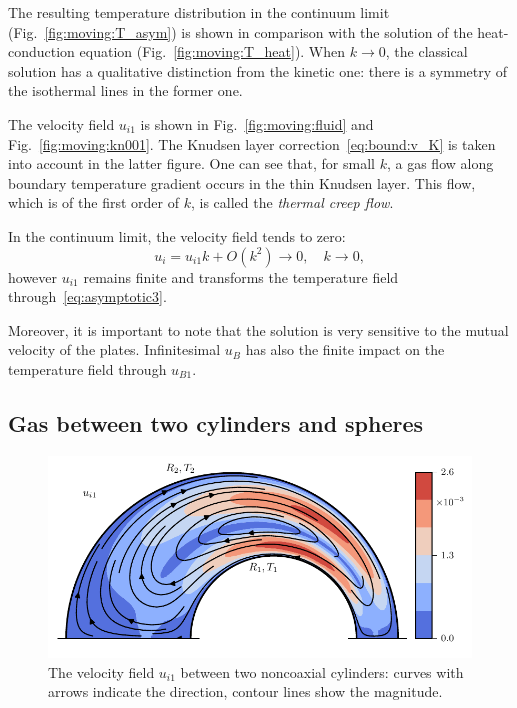 \documentclass[smallextended, referee]{svjour3} %
\begin{document}
The resulting temperature distribution in the continuum limit (Fig.~\ref{fig:moving:T_asym}) is shown
in comparison with the solution of the heat-conduction equation (Fig.~\ref{fig:moving:T_heat}).
When \(k\to0\), the classical solution has a qualitative distinction from the kinetic one: 
there is a symmetry of the isothermal lines in the former one.

The velocity field \(u_{i1}\) is shown in Fig.~\ref{fig:moving:fluid} and Fig.~\ref{fig:moving:kn001}.
The Knudsen layer correction~\eqref{eq:bound:v_K} is taken into account in the latter figure.
One can see that, for small \(k\), a gas flow along boundary temperature gradient occurs
in the thin Knudsen layer. This flow, which is of the first order of \(k\), is called
the \emph{thermal creep flow}.

In the continuum limit, the velocity field tends to zero:
\[ u_i = u_{i1}k + O(k^2) \to 0, \quad k\to0, \]
however \(u_{i1}\) remains finite and transforms the temperature field through~\eqref{eq:asymptotic3}.

Moreover, it is important to note that the solution is very sensitive to the mutual velocity of the plates.
Infinitesimal \(u_B\) has also the finite impact on the temperature field through \(u_{B1}\).

\subsection{Gas between two cylinders and spheres}

\begin{figure}
	\centering
	\includegraphics{Fig7}
	\caption{The velocity field \(u_{i1}\) between two noncoaxial cylinders:
		curves with arrows indicate the direction, contour lines show the magnitude.}
	\label{fig:cylinders}
\end{figure}
\end{document}
